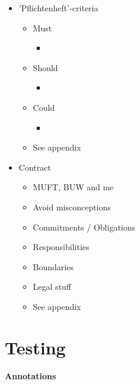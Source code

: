 \begin{itemize}
	\item 'Pflichtenheft'-criteria
	\begin{itemize}
		\item Must
		\begin{itemize}
			\item 
		\end{itemize}
		\item Should
		\begin{itemize}
			\item 
		\end{itemize}
		\item Could
		\begin{itemize}
			\item 
		\end{itemize}
		\item See appendix
	\end{itemize}
	\item Contract 
		\begin{itemize}
			\item MUFT, BUW and me
			\item Avoid misconceptions
			\item Commitments / Obligations
			\item Responsibilities
			\item Boundaries
			\item Legal stuff
			\item See appendix
		\end{itemize}
\end{itemize}


\section{Testing}
\label{conception_testing}

\paragraph{Annotations}

